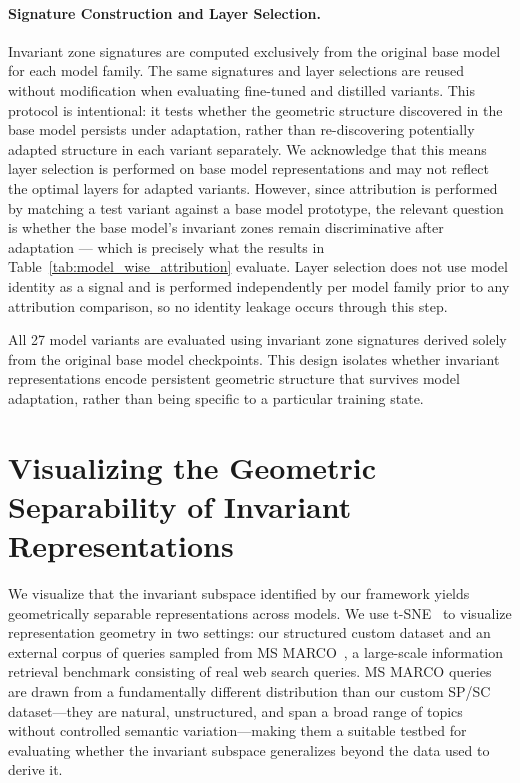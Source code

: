 \paragraph{Signature Construction and Layer Selection.}
Invariant zone signatures are computed exclusively from the original base model for each model family. The same signatures and layer selections are reused without modification when evaluating fine-tuned and distilled variants. This protocol is intentional: it tests whether the geometric structure discovered in the base model persists under adaptation, rather than re-discovering potentially adapted structure in each variant separately. We acknowledge that this means layer selection is performed on base model representations and may not reflect the optimal layers for adapted variants. However, since attribution is performed by matching a test variant against a base model prototype, the relevant question is whether the base model's invariant zones remain discriminative after adaptation — which is precisely what the results in Table~\ref{tab:model_wise_attribution} evaluate. Layer selection does not use model identity as a signal and is performed independently per model family prior to any attribution comparison, so no identity leakage occurs through this step.

All 27 model variants are evaluated using invariant zone signatures derived solely from the original base model checkpoints. This design isolates whether invariant representations encode persistent geometric structure that survives model adaptation, rather than being specific to a particular training state.



\section{Visualizing the Geometric Separability of Invariant Representations}
\label{app:extra_eval}
We visualize that the invariant subspace identified by our framework yields geometrically separable representations across models. We use t-SNE~\cite{vandermaaten2008} to visualize representation geometry in two settings: our structured custom dataset and an external corpus of queries sampled from MS MARCO~\cite{msmarco}, a large-scale information retrieval benchmark consisting of real web search queries. MS MARCO queries are drawn from a fundamentally different distribution than our custom SP/SC dataset—they are natural, unstructured, and span a broad range of topics without controlled semantic variation—making them a suitable testbed for evaluating whether the invariant subspace generalizes beyond the data used to derive it.

